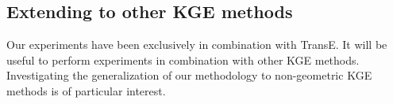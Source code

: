\subsection{Extending to other KGE methods}
Our experiments have been exclusively in combination with TransE. 
It will be useful to perform experiments in combination with other KGE methods. 
Investigating the generalization of our methodology to non-geometric KGE methods is of particular interest.
